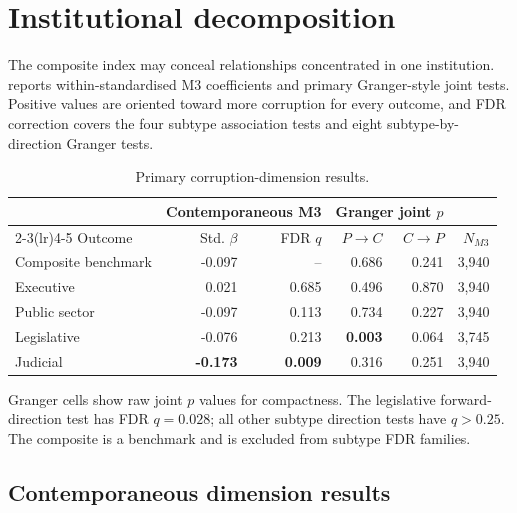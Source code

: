 \section{Institutional decomposition}
\label{sec:decomposition}

The composite index may conceal relationships concentrated in one institution. 
reports within-standardised M3 coefficients and primary Granger-style joint tests. Positive values are
oriented toward more corruption for every outcome, and FDR correction covers the four subtype
association tests and eight subtype-by-direction Granger tests.

\begin{table}[H]
\centering
\caption{Primary corruption-dimension results.}
\label{tab:decomp}
\begin{threeparttable}
\small
\begin{tabular}{lrrrrr}
\toprule
& \multicolumn{2}{c}{Contemporaneous M3} & \multicolumn{2}{c}{Granger joint $p$} \\
\cmidrule(lr){2-3}\cmidrule(lr){4-5}
Outcome & Std. $\beta$ & FDR $q$ & $P\rightarrow C$ & $C\rightarrow P$ & $N_{M3}$ \\
\midrule
Composite benchmark & -0.097 & -- & 0.686 & 0.241 & 3,940 \\
Executive & 0.021 & 0.685 & 0.496 & 0.870 & 3,940 \\
Public sector & -0.097 & 0.113 & 0.734 & 0.227 & 3,940 \\
Legislative & -0.076 & 0.213 & \textbf{0.003} & 0.064 & 3,745 \\
Judicial & \textbf{-0.173} & \textbf{0.009} & 0.316 & 0.251 & 3,940 \\
\bottomrule
\end{tabular}
\begin{tablenotes}[flushleft]\footnotesize
\item Granger cells show raw joint $p$ values for compactness. The legislative forward-direction test
has FDR $q=0.028$; all other subtype direction tests have $q>0.25$. The composite is a benchmark and is
excluded from subtype FDR families.
\end{tablenotes}
\end{threeparttable}
\end{table}

\subsection{Contemporaneous dimension results}

